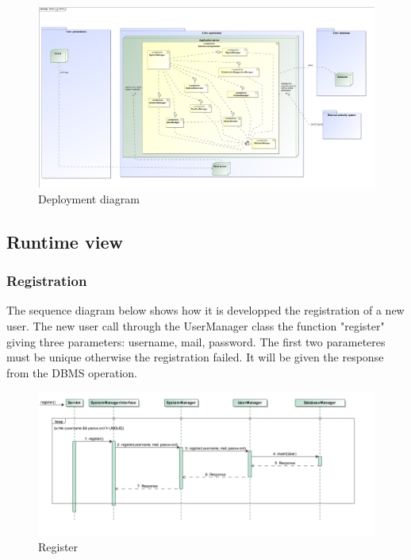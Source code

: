 \begin{figure}[H]
	\centering
	\includegraphics[width=1.12\linewidth]{Images/Deployment.png}
	\caption{Deployment diagram}
\end{figure}

\subsection{Runtime view}
\newpage

\subsubsection{Registration}
The sequence diagram below shows how it is developped the registration of a new user. The new user call through the UserManager class the function "register" giving three parameters: username, mail, password. The first two parameteres must be unique otherwise the registration failed.
It will be given the response from the DBMS operation.
\newpage
\begin{figure}
	\centering
	\includegraphics[width=0.95\linewidth, height=0.37\textheight]{Images/RunTimeDiagram/Sequence1}
	\caption{Register}
	\label{fig:Register}
\end{figure}
